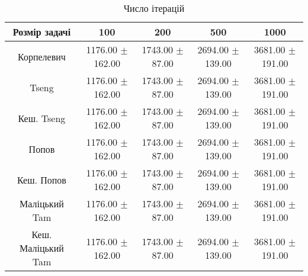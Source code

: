 \begin{table}[H]
	\centering
	\begin{tabular}{|c||c|c|c|c|}\hline
		Розмір задачі & 100 & 200 & 500 & 1000 \\ \hline \hline
		Корпелевич & 1176.00 $\pm$ 162.00 & 1743.00 $\pm$ 87.00 & 2694.00 $\pm$ 139.00 & 3681.00 $\pm$ 191.00 \\ \hline
		Tseng & 1176.00 $\pm$ 162.00 & 1743.00 $\pm$ 87.00 & 2694.00 $\pm$ 139.00 & 3681.00 $\pm$ 191.00 \\ \hline
		Кеш. Tseng & 1176.00 $\pm$ 162.00 & 1743.00 $\pm$ 87.00 & 2694.00 $\pm$ 139.00 & 3681.00 $\pm$ 191.00 \\ \hline
		Попов & 1176.00 $\pm$ 162.00 & 1743.00 $\pm$ 87.00 & 2694.00 $\pm$ 139.00 & 3681.00 $\pm$ 191.00 \\ \hline
		Кеш. Попов & 1176.00 $\pm$ 162.00 & 1743.00 $\pm$ 87.00 & 2694.00 $\pm$ 139.00 & 3681.00 $\pm$ 191.00 \\ \hline
		Маліцький Tam & 1176.00 $\pm$ 162.00 & 1743.00 $\pm$ 87.00 & 2694.00 $\pm$ 139.00 & 3681.00 $\pm$ 191.00 \\ \hline
		Кеш. Маліцький Tam & 1176.00 $\pm$ 162.00 & 1743.00 $\pm$ 87.00 & 2694.00 $\pm$ 139.00 & 3681.00 $\pm$ 191.00 \\ \hline
	\end{tabular}
	\caption{Число ітерацій}
\end{table}
